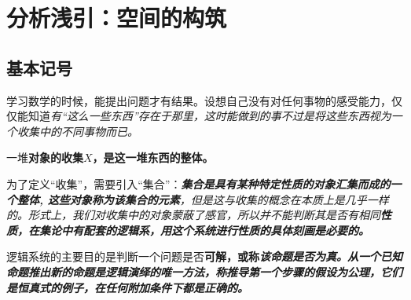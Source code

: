\chapter{分析浅引：空间的构筑}

\section{基本记号}

学习数学的时候，能提出问题才有结果。设想自己没有对任何事物的感受能力，仅仅能知道\it{有}“\it{这么一些东西}”存在于那里，这时能做到的事不过是将这些东西视为一个\it{收集}中的\it{不同}事物而已。

\begin{definition}
	
	一堆\bf{对象}的\bf{收集}$X$，是这一堆东西的整体。
	
\end{definition}

\begin{remark}
	
	为了定义“收集”，需要引入“集合”：\it{\bf{集合}是具有某种特定性质的对象汇集而成的一个整体, 这些对象称为该集合的\bf{元素}}，但是这与收集的概念在本质上是几乎一样的。形式上，我们对收集中的对象蒙蔽了感官，所以并不能判断其是否有相同\bf{性质}，在集论中有配套的\it{逻辑系}，用这个系统进行性质的具体刻画是必要的。
	
\end{remark}

逻辑系统的主要目的是判断一个问题是否\bf{可解}，或称\it{该命题是否为真}。从一个已知命题推出新的命题是\bf{逻辑演绎}的唯一方法，称推导第一个步骤的假设为\bf{公理}，它们是\bf{恒真式}的例子，在任何附加条件下都是正确的。

